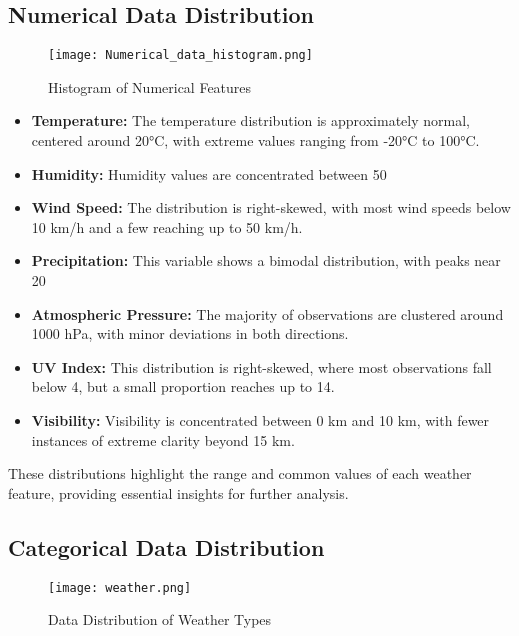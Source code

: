\documentclass{article}
\begin{document}
\subsection{Numerical Data Distribution}
\begin{figure}[H]
    \centering
    \texttt{[image: Numerical\_data\_histogram.png]}
    \caption{Histogram of Numerical Features}
\end{figure}

\begin{itemize}
\item \textbf{Temperature:} The temperature distribution is approximately normal, centered around 20°C, with extreme values ranging from -20°C to 100°C.

\item \textbf{Humidity:} Humidity values are concentrated between 50%

\item \textbf{Wind Speed:} The distribution is right-skewed, with most wind speeds below 10 km/h and a few reaching up to 50 km/h.

\item \textbf{Precipitation:} This variable shows a bimodal distribution, with peaks near 20%

\item \textbf{Atmospheric Pressure:} The majority of observations are clustered around 1000 hPa, with minor deviations in both directions.

\item \textbf{UV Index:} This distribution is right-skewed, where most observations fall below 4, but a small proportion reaches up to 14.

\item \textbf{Visibility:} Visibility is concentrated between 0 km and 10 km, with fewer instances of extreme clarity beyond 15 km.
\end{itemize}

These distributions highlight the range and common values of each weather feature, providing essential insights for further analysis.

\subsection{Categorical Data Distribution}
\begin{figure}[H]
    \centering
    \texttt{[image: weather.png]}
    \caption{Data Distribution of Weather Types}
\end{figure}
\end{document}
